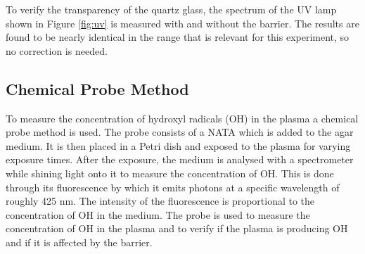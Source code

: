 To verify the transparency of the quartz glass, the spectrum of the UV lamp shown in Figure \ref{fig:uv} is measured with and without the barrier. The results are found to be nearly identical in the range that is relevant for this experiment, so no correction is needed. 

\subsection{Chemical Probe Method}
\label{sec:chemical_probe}
To measure the concentration of hydroxyl radicals (OH) in the plasma a chemical probe method is used. The probe consists of a NATA which is added to the agar medium. It is then placed in a Petri dish and exposed to the plasma for varying exposure times. After the exposure, the medium is analysed with a spectrometer while shining light onto it to measure the concentration of OH. This is done through its fluorescence by which it emits photons at a specific wavelength of roughly 425 nm. The intensity of the fluorescence is proportional to the concentration of OH in the medium. The probe is used to measure the concentration of OH in the plasma and to verify if the plasma is producing OH and if it is affected by the barrier. 